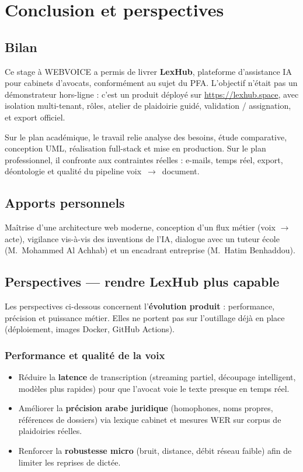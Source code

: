 \chapter{Conclusion et perspectives}
\label{ch:conclusion}

\section{Bilan}

Ce stage à WEBVOICE a permis de livrer \textbf{LexHub}, plateforme d'assistance IA pour cabinets d'avocats, conformément au sujet du PFA. L'objectif n'était pas un démonstrateur hors-ligne : c'est un produit déployé sur \url{https://lexhub.space}, avec isolation multi-tenant, rôles, atelier de plaidoirie guidé, validation / assignation, et export officiel.

Sur le plan académique, le travail relie analyse des besoins, étude comparative, conception UML, réalisation full-stack et mise en production. Sur le plan professionnel, il confronte aux contraintes réelles : e-mails, temps réel, export, déontologie et qualité du pipeline voix~$\rightarrow$~document.

\section{Apports personnels}

Maîtrise d'une architecture web moderne, conception d'un flux métier (voix $\rightarrow$ acte), vigilance vis-à-vis des inventions de l'IA, dialogue avec un tuteur école (M.~Mohammed Al Achhab) et un encadrant entreprise (M.~Hatim Benhaddou).

\section{Perspectives --- rendre LexHub plus capable}
\label{sec:perspectives}

Les perspectives ci-dessous concernent l'\textbf{évolution produit} : performance, précision et puissance métier. Elles ne portent pas sur l'outillage déjà en place (déploiement, images Docker, GitHub Actions).

\subsection{Performance et qualité de la voix}
\begin{itemize}[leftmargin=1.4em]
  \item Réduire la \textbf{latence} de transcription (streaming partiel, découpage intelligent, modèles plus rapides) pour que l'avocat voie le texte presque en temps réel.
  \item Améliorer la \textbf{précision arabe juridique} (homophones, noms propres, références de dossiers) via lexique cabinet et mesures WER sur corpus de plaidoiries réelles.
  \item Renforcer la \textbf{robustesse micro} (bruit, distance, débit réseau faible) afin de limiter les reprises de dictée.
\end{itemize}

